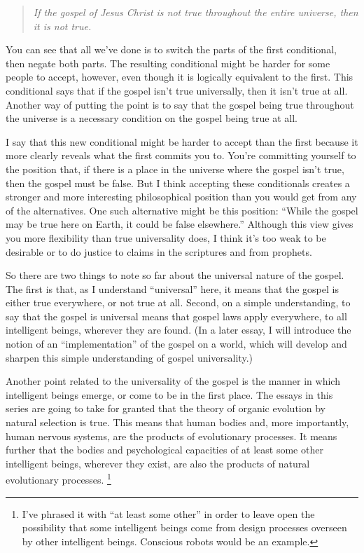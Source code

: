 	\begin{quote}
		\textit{If the gospel of Jesus Christ is not true throughout the entire universe, then it is not true.}
	\end{quote}
		
	You can see that all we've done is to switch the parts of the first conditional, then negate both parts. The resulting conditional might be harder for some people to accept, however, even though it is logically equivalent to the first. This conditional says that if the gospel isn't true universally, then it isn't true at all. Another way of putting the point is to say that the gospel being true throughout the universe is a necessary condition on the gospel being true at all.

	I say that this new conditional might be harder to accept than the first because it more clearly reveals what the first commits you to. You're committing yourself to the position that, if there is a place in the universe where the gospel isn't true, then the gospel must be false. But I think accepting these conditionals creates a stronger and more interesting philosophical position than you would get from any of the alternatives. One such alternative might be this position: ``While the gospel may be true here on Earth, it could be false elsewhere.'' Although this view gives you more flexibility than true universality does, I think it's too weak to be desirable or to do justice to claims in the scriptures and from prophets.

	So there are two things to note so far about the universal nature of the gospel. The first is that, as I understand ``universal'' here, it means that the gospel is either true everywhere, or not true at all. Second, on a simple understanding, to say that the gospel is universal means that gospel laws apply everywhere, to all intelligent beings, wherever they are found. (In a later essay, I will introduce the notion of an ``implementation'' of the gospel on a world, which will develop and sharpen this simple understanding of gospel universality.)

	Another point related to the universality of the gospel is the manner in which intelligent beings emerge, or come to be in the first place. The essays in this series are going to take for granted that the theory of organic evolution by natural selection is true. This means that human bodies and, more importantly, human nervous systems, are the products of evolutionary processes. It means further that the bodies and psychological capacities of at least some other intelligent beings, wherever they exist, are also the products of natural evolutionary processes.%
		\footnote{%
			\label{CTR-0002-natural-processes}%
			I've phrased it with ``at least some other'' in order to leave open the possibility that some intelligent beings come from design processes overseen by other intelligent beings. Conscious robots would be an example.
			}

